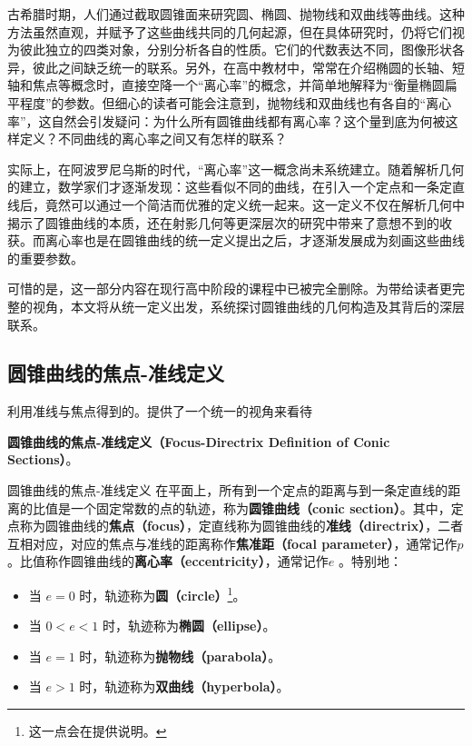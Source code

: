 
\begin{issues}
\issueDraft
\end{issues}


古希腊时期，人们通过截取圆锥面来研究圆、椭圆、抛物线和双曲线等曲线。这种方法虽然直观，并赋予了这些曲线共同的几何起源，但在具体研究时，仍将它们视为彼此独立的四类对象，分别分析各自的性质。它们的代数表达不同，图像形状各异，彼此之间缺乏统一的联系。另外，在高中教材中，常常在介绍椭圆的长轴、短轴和焦点等概念时，直接空降一个“离心率”的概念，并简单地解释为“衡量椭圆扁平程度”的参数。但细心的读者可能会注意到，抛物线和双曲线也有各自的“离心率”，这自然会引发疑问：为什么所有圆锥曲线都有离心率？这个量到底为何被这样定义？不同曲线的离心率之间又有怎样的联系？

实际上，在阿波罗尼乌斯的时代，“离心率”这一概念尚未系统建立。随着解析几何的建立，数学家们才逐渐发现：这些看似不同的曲线，在引入一个定点和一条定直线后，竟然可以通过一个简洁而优雅的定义统一起来。这一定义不仅在解析几何中揭示了圆锥曲线的本质，还在射影几何等更深层次的研究中带来了意想不到的收获。而离心率也是在圆锥曲线的统一定义提出之后，才逐渐发展成为刻画这些曲线的重要参数。

可惜的是，这一部分内容在现行高中阶段的课程中已被完全删除。为带给读者更完整的视角，本文将从统一定义出发，系统探讨圆锥曲线的几何构造及其背后的深层联系。

\subsection{圆锥曲线的焦点-准线定义}

利用准线与焦点得到的。提供了一个统一的视角来看待

\textbf{圆锥曲线的焦点-准线定义（Focus-Directrix Definition of Conic Sections）}。

\begin{definition}{圆锥曲线的焦点-准线定义}\label{def_HsCsFD_1}
在平面上，所有到一个定点的距离与到一条定直线的距离的比值是一个固定常数的点的轨迹，称为\textbf{圆锥曲线（conic section）}。其中，定点称为圆锥曲线的\textbf{焦点（focus）}，定直线称为圆锥曲线的\textbf{准线（directrix）}，二者互相对应，对应的焦点与准线的距离称作\textbf{焦准距（focal parameter）}，通常记作$p$。比值称作圆锥曲线的\textbf{离心率（eccentricity）}，通常记作$e$ 。特别地：
\begin{itemize}
\item 当 $e = 0$ 时，轨迹称为\textbf{圆（circle）}\footnote{这一点会在提供说明。}。
\item 当 $0 < e < 1$ 时，轨迹称为\textbf{椭圆（ellipse）}。
\item 当 $e = 1$ 时，轨迹称为\textbf{抛物线（parabola）}。
\item 当 $e > 1$ 时，轨迹称为\textbf{双曲线（hyperbola）}。
\end{itemize}
\end{definition}

